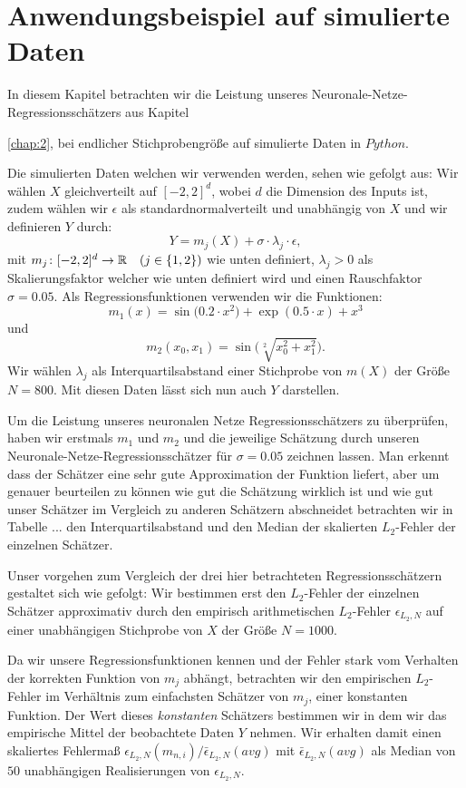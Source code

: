 \chapter{Anwendungsbeispiel auf simulierte Daten}
\label{chap:4}

In diesem Kapitel betrachten wir die Leistung unseres Neuronale-Netze-Regressionsschätzers aus Kapitel~{\ref{chap:2}, bei endlicher Stichprobengröße auf simulierte Daten in $Python$.

Die simulierten Daten welchen wir verwenden werden, sehen wie gefolgt aus:
Wir wählen $X$ gleichverteilt auf $[-2, 2]^d$, wobei $d$ die Dimension des Inputs ist, zudem wählen wir $\epsilon$ als standardnormalverteilt und unabhängig von $X$ und wir definieren $Y$ durch:
$$Y = m_j(X) + \sigma \cdot \lambda_j \cdot \epsilon,$$ 
mit $m_j \colon [-2, 2]^d \to \mathbb{R} \quad (j \in \{1, 2\})$ wie unten definiert, $\lambda_j > 0$ als Skalierungsfaktor welcher wie unten definiert wird und einen Rauschfaktor $\sigma = 0.05.$ Als Regressionsfunktionen verwenden wir die Funktionen:
$$ m_1(x) =  \sin\big(0.2 \cdot x^2\big) + \exp(0.5 \cdot x) + x^3$$
und
$$ m_2(x_0, x_1) = \sin\big(\sqrt[2]{x_0^2 + x_1^2}\big).$$
Wir wählen $\lambda_j$ als Interquartilsabstand einer Stichprobe von $m(X)$ der Größe $N = 800$. Mit diesen Daten lässt sich nun auch $Y$ darstellen.

Um die Leistung unseres neuronalen Netze Regressionsschätzers zu überprüfen, haben wir erstmals $m_1$ und $m_2$ und die jeweilige Schätzung durch unseren Neuronale-Netze-Regressionsschätzer für $\sigma = 0.05$ zeichnen lassen. 
Man erkennt dass der Schätzer eine sehr gute Approximation der Funktion liefert, aber um genauer beurteilen zu können wie gut die Schätzung wirklich ist und wie gut unser Schätzer im Vergleich zu anderen Schätzern abschneidet betrachten wir in Tabelle ... den Interquartilsabstand und den Median der skalierten $L_2$-Fehler der einzelnen Schätzer. 

Unser vorgehen zum Vergleich der drei hier betrachteten Regressionsschätzern gestaltet sich wie gefolgt:
Wir bestimmen erst den $L_2$-Fehler der einzelnen Schätzer approximativ durch den empirisch arithmetischen $L_2$-Fehler $\epsilon_{L_2,N}$ auf einer unabhängigen Stichprobe von $X$ der Größe $N = 1000$. 

Da wir unsere Regressionsfunktionen kennen und der Fehler stark vom Verhalten der korrekten Funktion von $m_j$ abhängt, betrachten wir den empirischen $L_2$-Fehler im Verhältnis zum einfachsten Schätzer von $m_j$, einer konstanten Funktion. Der Wert dieses \textit{konstanten} Schätzers bestimmen wir in dem wir das empirische Mittel der beobachtete Daten $Y$ nehmen. Wir erhalten damit einen skaliertes Fehlermaß $\epsilon_{L_2,N}(m_{n,i})/\bar{\epsilon}_{L_2,N}(avg)$ mit $\bar{\epsilon}_{L_2,N}(avg)$ als Median von $50$ unabhängigen Realisierungen von $\epsilon_{L_2,N}$. 

}
